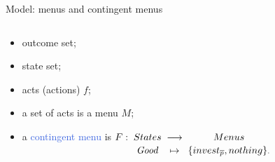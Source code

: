 \documentclass[usenames,dvipsnames,aspectratio=169,11pt]{beamer}
\begin{document}
\begin{frame}[noframenumbering]{Model: menus and contingent menus}
\begin{columns}
		\begin{column}{0.45\textwidth}  %
			\begin{itemize}
				\item outcome set;
				\item state set;
				\item acts (actions) \( f \);
				\item a set of acts is a menu \( M \);
				\item a \textcolor{RoyalBlue}{contingent menu} is \(F:\; \underset{\rule{0pt}{1.2em}\text{\normalsize \textit{Good}}}{States}
				      \;\underset{\rule{0pt}{1.2em}\text{\normalsize $\mapsto$}}{\longrightarrow}\;
				      \underset{\rule{0pt}{1.2em}\text{\normalsize ${\{invest_{\overline{p}}, nothing\}}$}.}{Menus} \)
			\end{itemize}
		\end{column}
	\end{columns}

\end{frame}
\end{document}
